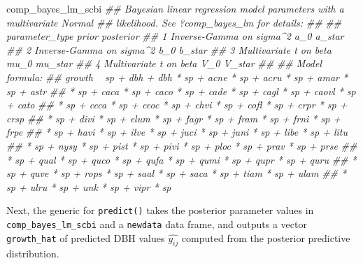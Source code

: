 \documentclass[12pt]{article}
\newenvironment{Shaded}{\begin{snugshade}}{\end{snugshade}}
\newcommand{\CommentTok}[1]{\textcolor[rgb]{0.56,0.35,0.01}{\textit{#1}}}
\newcommand{\DataTypeTok}[1]{\textcolor[rgb]{0.13,0.29,0.53}{#1}}
\newcommand{\KeywordTok}[1]{\textcolor[rgb]{0.13,0.29,0.53}{\textbf{#1}}}
\newcommand{\NormalTok}[1]{#1}
\newcommand{\OperatorTok}[1]{\textcolor[rgb]{0.81,0.36,0.00}{\textbf{#1}}}
\newcommand{\StringTok}[1]{\textcolor[rgb]{0.31,0.60,0.02}{#1}}
\begin{document}
\begin{Shaded}
\begin{Highlighting}[]
\NormalTok{comp_bayes_lm_scbi}
\CommentTok{## Bayesian linear regression model parameters with a multivariate Normal}
\CommentTok{## likelihood. See ?comp_bayes_lm for details:}
\CommentTok{## }
\CommentTok{##   parameter_type           prior posterior}
\CommentTok{## 1 Inverse-Gamma on sigma^2 a_0   a_star   }
\CommentTok{## 2 Inverse-Gamma on sigma^2 b_0   b_star   }
\CommentTok{## 3 Multivariate t on beta   mu_0  mu_star  }
\CommentTok{## 4 Multivariate t on beta   V_0   V_star   }
\CommentTok{## }
\CommentTok{## Model formula:}
\CommentTok{## growth ~ sp + dbh + dbh * sp + acne * sp + acru * sp + amar * sp + astr}
\CommentTok{## * sp + caca * sp + caco * sp + cade * sp + cagl * sp + caovl * sp + cato}
\CommentTok{## * sp + ceca * sp + ceoc * sp + chvi * sp + cofl * sp + crpr * sp + crsp}
\CommentTok{## * sp + divi * sp + elum * sp + fagr * sp + fram * sp + frni * sp + frpe}
\CommentTok{## * sp + havi * sp + ilve * sp + juci * sp + juni * sp + libe * sp + litu}
\CommentTok{## * sp + nysy * sp + pist * sp + pivi * sp + ploc * sp + prav * sp + prse}
\CommentTok{## * sp + qual * sp + quco * sp + qufa * sp + qumi * sp + qupr * sp + quru}
\CommentTok{## * sp + quve * sp + rops * sp + saal * sp + saca * sp + tiam * sp + ulam}
\CommentTok{## * sp + ulru * sp + unk * sp + vipr * sp}
\end{Highlighting}
\end{Shaded}

Next, the generic for \texttt{predict()} takes the posterior parameter
values in \texttt{comp\_bayes\_lm\_scbi} and a \texttt{newdata} data
frame, and outputs a vector \texttt{growth\_hat} of predicted DBH values
\(\widehat{y_{ij}}\) computed from the posterior predictive
distribution.

\begin{Shaded}
\end{Shaded}

\begin{Shaded}
\end{Shaded}
\end{document}

